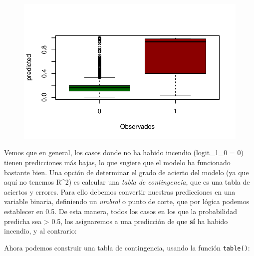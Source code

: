 \documentclass[
  letterpaper,
  DIV=11,
  numbers=noendperiod]{scrreprt}
\newenvironment{Shaded}{\begin{snugshade}}{\end{snugshade}}
\newcommand{\AttributeTok}[1]{\textcolor[rgb]{0.40,0.45,0.13}{#1}}
\newcommand{\DecValTok}[1]{\textcolor[rgb]{0.68,0.00,0.00}{#1}}
\newcommand{\FloatTok}[1]{\textcolor[rgb]{0.68,0.00,0.00}{#1}}
\newcommand{\FunctionTok}[1]{\textcolor[rgb]{0.28,0.35,0.67}{#1}}
\newcommand{\NormalTok}[1]{\textcolor[rgb]{0.00,0.23,0.31}{#1}}
\newcommand{\OtherTok}[1]{\textcolor[rgb]{0.00,0.23,0.31}{#1}}
\newcommand{\SpecialCharTok}[1]{\textcolor[rgb]{0.37,0.37,0.37}{#1}}
\begin{document}
\begin{figure}[H]

{\centering \includegraphics{02_GLM_files/figure-pdf/unnamed-chunk-13-1.pdf}

}

\end{figure}

Vemos que en general, los casos donde no ha habido incendio (logit\_1\_0
= 0) tienen predicciones más bajas, lo que sugiere que el modelo ha
funcionado bastante bien. Una opción de determinar el grado de acierto
del modelo (ya que aquí no tenemos R\^{}2) es calcular una \emph{tabla
de contingencia}, que es una tabla de aciertos y errores. Para ello
debemos convertir nuestras predicciones en una variable binaria,
definiendo un \emph{umbral} o punto de corte, que por lógica podemos
establecer en 0.5. De esta manera, todos los casos en los que la
probabilidad predicha sea \textgreater{} 0.5, los asignaremos a una
predicción de que \textbf{sí} ha habido incendio, y al contrario:

\begin{Shaded}
\end{Shaded}

Ahora podemos construir una tabla de contingencia, usando la función
\texttt{table()}:
\end{document}
